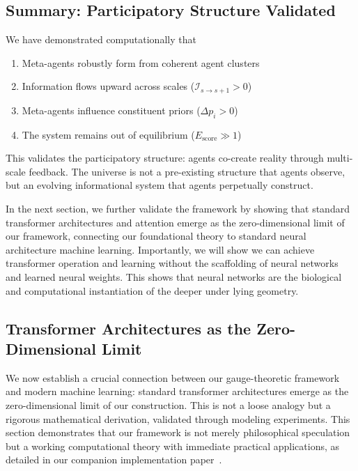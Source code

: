 \documentclass[11pt]{article}
\begin{document}
\subsection{Summary: Participatory Structure Validated}

We have demonstrated computationally that

\begin{enumerate}
\item Meta-agents robustly form from coherent agent clusters
\item Information flows upward across scales ($\mathcal{I}_{s \to s+1} > 0$)
\item Meta-agents influence constituent priors ($\Delta p_i > 0$)
\item The system remains out of equilibrium ($E_{\mathrm{score}} \gg 1$)
\end{enumerate}

This validates the participatory structure: agents co-create reality through multi-scale feedback. The universe is not a pre-existing structure that agents observe, but an evolving informational system that agents perpetually construct.

In the next section, we further validate the framework by showing that standard transformer architectures and attention emerge as the zero-dimensional limit of our framework, connecting our foundational theory to standard neural architecture machine learning.  Importantly, we will show we can achieve transformer operation and learning without the scaffolding of neural networks and learned neural weights.  This shows that neural networks are the biological and computational instantiation of the deeper under lying geometry. 

\subsection{Transformer Architectures as the Zero-Dimensional Limit}
\label{sec:transformers}

We now establish a crucial connection between our gauge-theoretic framework and modern machine learning: standard transformer architectures emerge as the zero-dimensional limit of our construction. This is not a loose analogy but a rigorous mathematical derivation, validated through modeling experiments. This section demonstrates that our framework is not merely philosophical speculation but a working computational theory with immediate practical applications, as detailed in our companion implementation paper~\cite{Dennis2025transf}.
\end{document}
